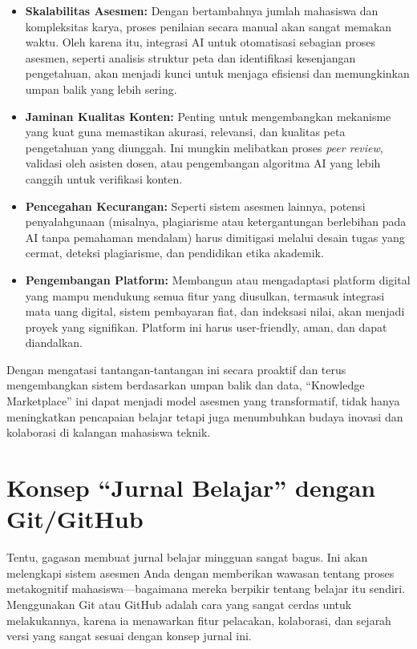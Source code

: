 \documentclass[
  letterpaper,
  DIV=11,
  numbers=noendperiod]{scrreprt}
\begin{document}
\begin{itemize}
\item
  \textbf{Skalabilitas Asesmen:} Dengan bertambahnya jumlah mahasiswa
  dan kompleksitas karya, proses penilaian secara manual akan sangat
  memakan waktu. Oleh karena itu, integrasi AI untuk otomatisasi
  sebagian proses asesmen, seperti analisis struktur peta dan
  identifikasi kesenjangan pengetahuan, akan menjadi kunci untuk menjaga
  efisiensi dan memungkinkan umpan balik yang lebih sering.
\item
  \textbf{Jaminan Kualitas Konten:} Penting untuk mengembangkan
  mekanisme yang kuat guna memastikan akurasi, relevansi, dan kualitas
  peta pengetahuan yang diunggah. Ini mungkin melibatkan proses
  \emph{peer review}, validasi oleh asisten dosen, atau pengembangan
  algoritma AI yang lebih canggih untuk verifikasi konten.
\item
  \textbf{Pencegahan Kecurangan:} Seperti sistem asesmen lainnya,
  potensi penyalahgunaan (misalnya, plagiarisme atau ketergantungan
  berlebihan pada AI tanpa pemahaman mendalam) harus dimitigasi melalui
  desain tugas yang cermat, deteksi plagiarisme, dan pendidikan etika
  akademik.
\item
  \textbf{Pengembangan Platform:} Membangun atau mengadaptasi platform
  digital yang mampu mendukung semua fitur yang diusulkan, termasuk
  integrasi mata uang digital, sistem pembayaran fiat, dan indeksasi
  nilai, akan menjadi proyek yang signifikan. Platform ini harus
  user-friendly, aman, dan dapat diandalkan.
\end{itemize}

Dengan mengatasi tantangan-tantangan ini secara proaktif dan terus
mengembangkan sistem berdasarkan umpan balik dan data, ``Knowledge
Marketplace'' ini dapat menjadi model asesmen yang transformatif, tidak
hanya meningkatkan pencapaian belajar tetapi juga menumbuhkan budaya
inovasi dan kolaborasi di kalangan mahasiswa teknik.


\chapter{Konsep ``Jurnal Belajar'' dengan
Git/GitHub}\label{konsep-jurnal-belajar-dengan-gitgithub}

Tentu, gagasan membuat jurnal belajar mingguan sangat bagus. Ini akan
melengkapi sistem asesmen Anda dengan memberikan wawasan tentang proses
metakognitif mahasiswa---bagaimana mereka berpikir tentang belajar itu
sendiri. Menggunakan Git atau GitHub adalah cara yang sangat cerdas
untuk melakukannya, karena ia menawarkan fitur pelacakan, kolaborasi,
dan sejarah versi yang sangat sesuai dengan konsep jurnal ini.
\end{document}
